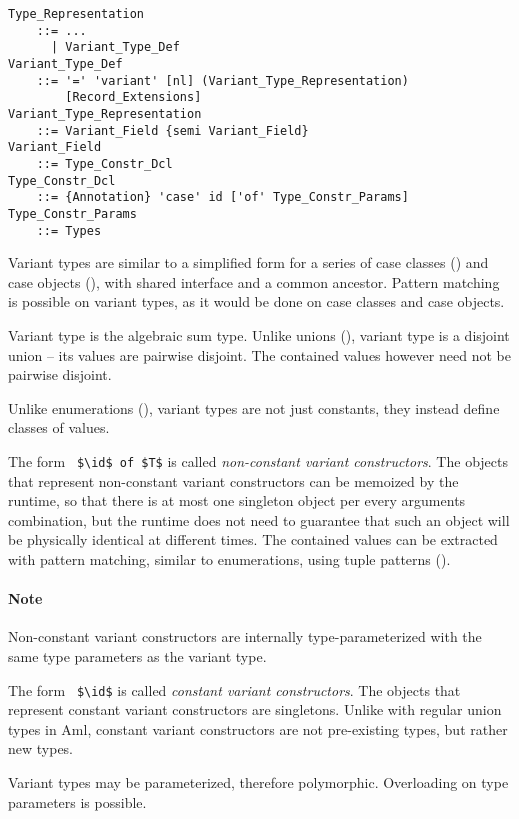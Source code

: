 \grammar\begin{lstlisting}
Type_Representation
    ::= ...
      | Variant_Type_Def
Variant_Type_Def
    ::= '=' 'variant' [nl] (Variant_Type_Representation) 
        [Record_Extensions]
Variant_Type_Representation 
    ::= Variant_Field {semi Variant_Field}
Variant_Field
    ::= Type_Constr_Dcl
Type_Constr_Dcl
    ::= {Annotation} 'case' id ['of' Type_Constr_Params]
Type_Constr_Params
    ::= Types
\end{lstlisting}

Variant types are similar to a simplified form for a series of case classes () and case objects (), with shared interface and a common ancestor. Pattern matching is possible on variant types, as it would be done on case classes and case objects. 

Variant type is the algebraic sum type. Unlike unions (), variant type is a disjoint union -- its values are pairwise disjoint. The contained values however need not be pairwise disjoint. 

Unlike enumerations (), variant types are not just constants, they instead define classes of values. 

The form ~\lstinline!$\id$ of $T$! is called {\em non-constant variant constructors}. The objects that represent non-constant variant constructors can be memoized by the runtime, so that there is at most one singleton object per every arguments combination, but the runtime does not need to guarantee that such an object will be physically identical at different times. The contained values can be extracted with pattern matching, similar to enumerations, using tuple patterns (). 

\paragraph{Note}
Non-constant variant constructors are internally type-parameterized with the same type parameters as the variant type. 

The form ~\lstinline!$\id$! is called {\em constant variant constructors}. The objects that represent constant variant constructors are singletons. Unlike with regular union types in Aml, constant variant constructors are not pre-existing types, but rather new types. 

Variant types may be parameterized, therefore polymorphic. Overloading on type parameters is possible. 

